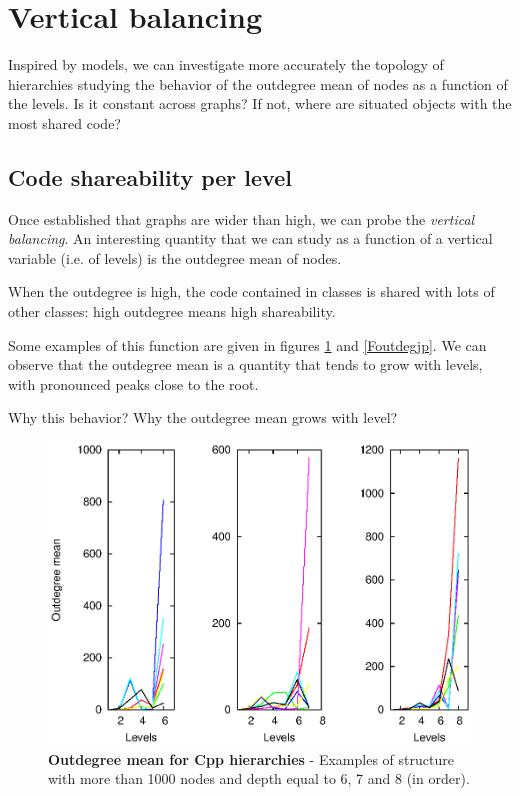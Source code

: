 \section{Vertical balancing}
Inspired by models, we can investigate more accurately the topology of hierarchies studying the behavior of the outdegree mean of nodes as a function of the levels. Is it constant across graphs? If not, where are situated objects with the most shared code?

\subsection{Code shareability per level}
Once established that graphs are wider than high, we can probe the \textit{vertical balancing}. An interesting quantity that we can study as a function of a vertical variable (i.e. of levels) is the outdegree mean of nodes.

When the outdegree is high, the code contained in classes is shared with lots of other classes: high outdegree means high shareability.

Some examples of this function are given in figures \ref{Foutdegcpp} and \ref{Foutdegjp}. We can observe that the outdegree mean is a quantity that tends to grow with levels, with pronounced peaks close to the root. 

Why this behavior? Why the outdegree mean grows with level?

\begin{figure}[ht]%
\includegraphics[width=\textwidth,draft=false]{grafici/Coutdeg.cpp2.eps}
\caption{\label{Foutdegcpp} \footnotesize\textbf{Outdegree mean for Cpp hierarchies} - Examples of structure with more than 1000 nodes and depth equal to 6, 7 and 8 (in order).}
\end{figure}

